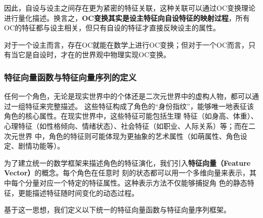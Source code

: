 因此，自设与设主之间存在更为紧密的特征关联，这种关联可以通过OC变换理论进行量化描述。换言之，\textbf{OC变换其实是设主特征向自设特征的映射过程}，所有OC的特征都与设主相关，但只有自设的特征才直接反映设主的属性。

对于一个设主而言，存在OC就能在数学上进行OC变换；但对于一个OC而言，只有当它是自设时，才在\wkn{}的世界观中物理实现OC变换。

\subsubsection{特征向量函数与特征向量序列的定义}

任何一个角色，无论是现实世界中的个体还是二次元世界中的虚构人物，都可以通过一组特征来完整描述。
这些特征构成了角色的“身份指纹”，能够唯一地表征该角色的核心属性。在现实世界中，这些特征可能包括生理
特征（如身高、体重）、心理特征（如性格倾向、情绪状态）、社会特征（如职业、人际关系）等；而在二次元世界
中，角色的特征则可能体现为更抽象的艺术属性（如萌属性、角色设定、剧情功能等）。

为了建立统一的数学框架来描述角色的特征演化，我们引入\textbf{特征向量（Feature Vector）}的概念。每个角色在任意时
刻的状态都可以用一个多维向量来表示，其中每个分量对应一个特定的特征属性。这种表示方法不仅能够捕捉角
色的静态特征，更能描述特征随时间变化的动态过程。

基于这一思想，我们定义以下统一的特征向量函数与特征向量序列框架。

